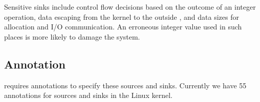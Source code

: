 Sensitive sinks include control flow decisions based on the outcome
of an integer operation, data escaping from the kernel to the
outside , and data
sizes for allocation and I/O communication.  An erroneous integer
value used in such places is more likely to damage the system.

\subsection{Annotation}

\sys requires annotations to specify these sources and sinks.
Currently we have 55 annotations for sources and sinks in the Linux kernel.
